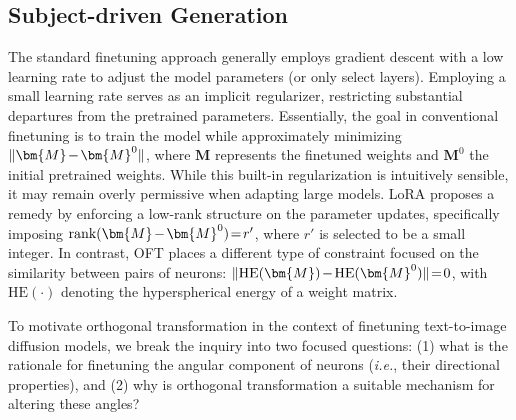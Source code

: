 \subsection{Subject-driven Generation}

\begin{itemize}[leftmargin=*,nosep]

The standard finetuning approach generally employs gradient descent with a low learning rate to adjust the model parameters (or only select layers). Employing a small learning rate serves as an implicit regularizer, restricting substantial departures from the pretrained parameters. Essentially, the goal in conventional finetuning is to train the model while approximately minimizing $\thickmuskip=2mu \medmuskip=2mu \| \bm{M} - \bm{M}^0\|$, where $\bm{M}$ represents the finetuned weights and $\bm{M}^0$ the initial pretrained weights. While this built-in regularization is intuitively sensible, it may remain overly permissive when adapting large models. LoRA proposes a remedy by enforcing a low-rank structure on the parameter updates, specifically imposing $\thickmuskip=2mu \medmuskip=2mu \text{rank}(\bm{M} - \bm{M}^0)=r'$, where $r'$ is selected to be a small integer. In contrast, OFT places a different type of constraint focused on the similarity between pairs of neurons: $\thickmuskip=2mu \medmuskip=2mu \| \text{HE}(\bm{M})-\text{HE}(\bm{M}^0) \|=0$, with $\text{HE}(\cdot)$ denoting the hyperspherical energy of a weight matrix.

To motivate orthogonal transformation in the context of finetuning text-to-image diffusion models, we break the inquiry into two focused questions: (1) what is the rationale for finetuning the angular component of neurons (\emph{i.e.}, their directional properties), and (2) why is orthogonal transformation a suitable mechanism for altering these angles?


\end{itemize}
